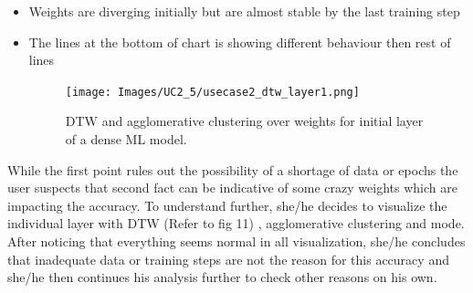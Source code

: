 \documentclass[journal]{vgtc}                %
\begin{document}
\begin{itemize}
\item Weights are diverging initially but are almost stable by the last training step 
\item The lines at the bottom of chart is showing different behaviour then rest of lines 
 \begin{figure}
    \texttt{[image: Images/UC2\_5/usecase2\_dtw\_layer1.png]}
    \caption{DTW and agglomerative clustering over weights for initial layer of a dense ML model.}
    \label{case2_dtw_layer0}
\end{figure}







 


\end{itemize}
While the first point rules out the possibility of a shortage of data or epochs the user suspects that second fact can be indicative of some crazy weights which are impacting the accuracy. To understand further, she/he decides to visualize the individual layer with DTW (Refer to fig 11) , agglomerative clustering and mode. After noticing that everything seems normal in all visualization, she/he concludes that inadequate data or training steps are not the reason for this accuracy and she/he then
continues his analysis further to check other reasons on his own.
\end{document}
